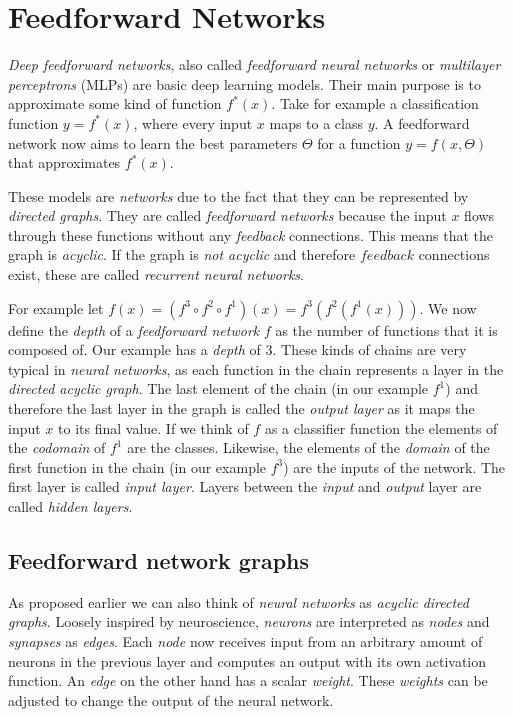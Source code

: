 \section{Feedforward Networks}
\label{sec:feedforward-networks}

\emph{Deep feedforward networks}, also called \emph{feedforward neural networks} or \emph{multilayer perceptrons} (MLPs) are basic deep learning models.
Their main purpose is to approximate some kind of function \(f^*(x)\).
Take for example a classification function \(y = f^*(x)\), where every input \(x\) maps to a class \(y\).
A feedforward network now aims to learn the best parameters \(\Theta\) for a function \(y = f(x, \Theta)\) that approximates \(f^*(x)\).

These models are \emph{networks} due to the fact that they can be represented by \emph{directed graphs}.
They are called \emph{feedforward networks} because the input \(x\) flows through these functions without any \emph{feedback} connections.
This means that the graph is \emph{acyclic}.
If the graph is \emph{not acyclic} and therefore \(feedback\) connections exist, these are called \emph{recurrent neural networks}.

For example let \(f(x) = (f^3 \circ f^2 \circ f^1)(x) = f^3(f^2(f^1(x)))\).
We now define the \emph{depth} of a \emph{feedforward network} \(f\) as the number of functions that it is composed of.
Our example has a \emph{depth} of \(3\).
These kinds of chains are very typical in \emph{neural networks}, as each function in the chain represents a layer in the \emph{directed acyclic graph}.
The last element of the chain (in our example \(f^1\)) and therefore the last layer in the graph is called the \emph{output layer} as it maps the input \(x\) to its final value.
If we think of \(f\) as a classifier function the elements of the \emph{codomain} of \(f^1\) are the classes.
Likewise, the elements of the \emph{domain} of the first function in the chain (in our example \(f^3\)) are the inputs of the network.
The first layer is called \emph{input layer}.
Layers between the \emph{input} and \emph{output} layer are called \emph{hidden layers}.

\subsection{Feedforward network graphs}
As proposed earlier we can also think of \emph{neural networks} as \emph{acyclic directed graphs}.
Loosely inspired by neuroscience, \emph{neurons} are interpreted as \emph{nodes} and \emph{synapses} as \emph{edges}.
Each \emph{node} now receives input from an arbitrary amount of neurons in the previous layer and computes an output with its own activation function.
An \emph{edge} on the other hand has a scalar \emph{weight}.
These \emph{weights} can be adjusted to change the output of the neural network.

